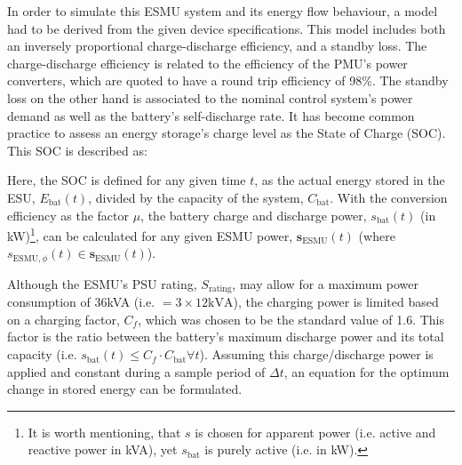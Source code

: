 In order to simulate this ESMU system and its energy flow behaviour, a model had to be derived from the given device specifications.
This model includes both an inversely proportional charge-discharge efficiency, and a standby loss.
The charge-discharge efficiency is related to the efficiency of the PMU's power converters, which are quoted to have a round trip efficiency of 98\%.
The standby loss on the other hand is associated to the nominal control system's power demand as well as the battery's self-discharge rate.
It has become common practice to assess an energy storage's charge level as the State of Charge (SOC).
This SOC is described as:



\nomenclature{$\eta$}{Round-trip efficiency of power electronics, where $\eta \in (0, 1]$ (Chapter \ref{ch1}).}


Here, the SOC is defined for any given time $t$, as the actual energy stored in the ESU, $E_\text{bat}(t)$, divided by the capacity of the system, $C_\text{bat}$.
With the conversion efficiency as the factor $\mu$, the battery charge and discharge power, $s_\text{bat}(t)$ (in kW)\footnote[1]{It is worth mentioning, that $s$ is chosen for apparent power (i.e. active and reactive power in kVA), yet $s_\text{bat}$ is purely active (i.e. in kW).}, can be calculated for any given ESMU power, $\textbf{s}_\text{ESMU}(t)$ (where $s_{\text{ESMU},\phi}(t) \in \textbf{s}_\text{ESMU}(t)$).




Although the ESMU's PSU rating, $S_\text{rating}$, may allow for a maximum power consumption of 36kVA (i.e. $=3\times12\text{kVA}$), the charging power is limited based on a charging factor, $C_f$, which was chosen to be the standard value of 1.6.
This factor is the ratio between the battery's maximum discharge power and its total capacity (i.e. $s_\text{bat}(t) \leq C_f \cdot C_\text{bat} \forall t$).
Assuming this charge/discharge power is applied and constant during a sample period of $\Delta t$, an equation for the optimum change in stored energy can be formulated.

